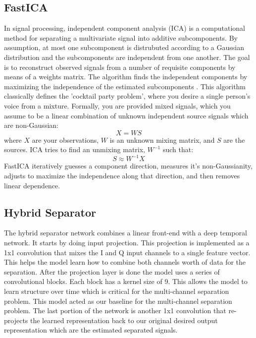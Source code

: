 \documentclass[conference]{IEEEtran}
\begin{document}
\subsection{FastICA}
In signal processing, independent component analysis (ICA) is a computational method for separating a multivariate signal into additive subcomponents. By assumption, at most one subcomponent is distrubuted according to a Gaussian distribution and the subcomponents are independent from one another. The goal is to reconstruct observed signals from a number of requisite components by means of a weights matrix. The algorithm finds the independent components by maximizing the independence of the estimated subcomponents \cite{ica_wikipedia}. This algorithm classically defines the 'cocktail party problem', where you desire a single person's voice from a mixture. Formally, you are provided mixed signals, which you assume to be a linear combination of unknown independent source signals which are non-Gaussian:
\[
X = WS
\]
where $X$ are your observations, $W$ is an unknown mixing matrix, and $S$ are the sources. ICA tries to find an unmixing matrix, $W^{-1}$ such that:
\[
S \approx W^{-1}X
\]
FastICA iteratively guesses a component direction, measures it's non-Gaussianity, adjusts to maximize the independence along that direction, and then removes linear dependence.

\subsection{Hybrid Separator}
The hybrid separator network combines a linear front-end with a deep temporal network. It starts by doing input projection. This projection is implemented as a 1x1 convolution that mixes the I and Q input channels to a single feature vector. This helps the model learn how to combine both channels worth of data for the separation. After the projection layer is done the model uses a series of convolutional blocks. Each block has a kernel size of 9. This allows the model to learn structure over time which is critical for the multi-channel separation problem. This model acted as our baseline for the multi-channel separation problem. The last portion of the network is another 1x1 convolution that re-projects the learned representation back to our original desired output representation which are the estimated separated signals.
\end{document}
